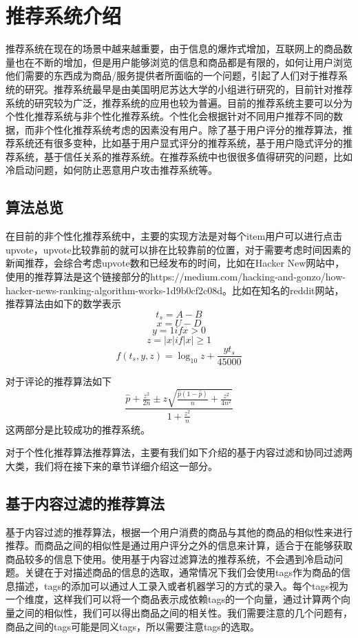 \section{推荐系统介绍}
推荐系统在现在的场景中越来越重要，由于信息的爆炸式增加，互联网上的商品数量也在不断的增加，但是用户能够浏览的信息和商品都是有限的，如何让用户浏览他们需要的东西成为商品/服务提供者所面临的一个问题，引起了人们对于推荐系统的研究。推荐系统最早是由美国明尼苏达大学的小组进行研究的，目前针对推荐系统的研究较为广泛，推荐系统的应用也较为普遍。目前的推荐系统主要可以分为个性化推荐系统与非个性化推荐系统。个性化会根据针对不同用户推荐不同的数据，而非个性化推荐系统考虑的因素没有用户。除了基于用户评分的推荐算法，推荐系统还有很多变种，比如基于用户显式评分的推荐系统，基于用户隐式评分的推荐系统，基于信任关系的推荐系统。在推荐系统中也很很多值得研究的问题，比如冷启动问题，如何防止恶意用户攻击推荐系统等。
\subsection{算法总览}
在目前的非个性化推荐系统中，主要的实现方法是对每个item用户可以进行点击upvote，upvote比较靠前的就可以排在比较靠前的位置，对于需要考虑时间因素的新闻推荐，会综合考虑upvote数和已经发布的时间，比如在Hacker New网站中，使用的推荐算法是这个链接部分的https://medium.com/hacking-and-gonzo/how-hacker-news-ranking-algorithm-works-1d9b0cf2c08d。比如在知名的reddit网站，推荐算法由如下的数学表示
$$    t_s = A - B$$
$$x = U - D$$
$$ y = 1 if x > 0$$
$$z = |x| if |x| \geq 1$$
\begin{equation}
f(t_s, y, z) = \log_{10}z + \frac{yt_s}{45000}    
\end{equation}

对于评论的推荐算法如下
\begin{equation}
    \frac{\hat{p}+\frac{z^2}{2n}\pm z\sqrt{\frac{\hat{p}(1-\hat{p})}{n}+\frac{z^2}{4n^2}}}{1+\frac{z^2}{n}}
\end{equation}
这两部分是比较成功的推荐系统。

对于个性化推荐算法推荐算法，主要有我们如下介绍的基于内容过滤和协同过滤两大类，我们将在接下来的章节详细介绍这一部分。

\subsection{基于内容过滤的推荐算法}
基于内容过滤的推荐算法，根据一个用户消费的商品与其他的商品的相似性来进行推荐。而商品之间的相似性是通过用户评分之外的信息来计算，适合于在能够获取商品较多的信息下使用。使用基于内容过滤算法的推荐系统，不会遇到冷启动问题。关键在于对描述商品的信息的选取，通常情况下我们会使用tags作为商品的信息描述，tags的添加可以通过人工录入或者机器学习的方式的录入。每个tags视为一个维度，这样我们可以将一个商品表示成依赖tags的一个向量，通过计算两个向量之间的相似性，我们可以得出商品之间的相关性。我们需要注意的几个问题有，商品之间的tags可能是同义tags，所以需要注意tags的选取。

